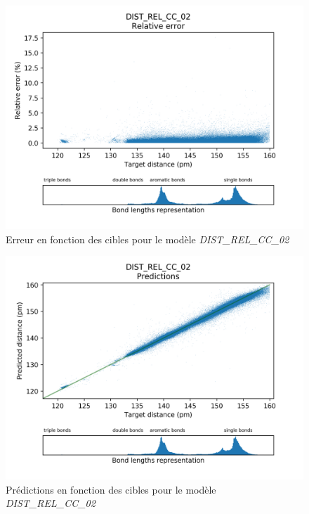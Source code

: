 \begin{figure}
	\centering
	
	\includegraphics[scale=0.8]{../figures/DIST_REL_CC_02/DIST_REL_CC_02_distrib_rmse_dist.png}	
	
	\caption{Erreur en fonction des cibles pour le modèle \emph{DIST\_REL\_CC\_02}}
		\label{fdistrib_err_rel_dist_rel_cc_02}

	\end{figure}

\begin{figure}
	\centering
	
	\includegraphics[scale=0.8]{../figures/DIST_REL_CC_02/DIST_REL_CC_02_preds_targets.png}	
	
	\caption{Prédictions en fonction des cibles pour le modèle \emph{DIST\_REL\_CC\_02}}
	\label{fpreds_targets_dist_rel_cc_02}
	
\end{figure}

